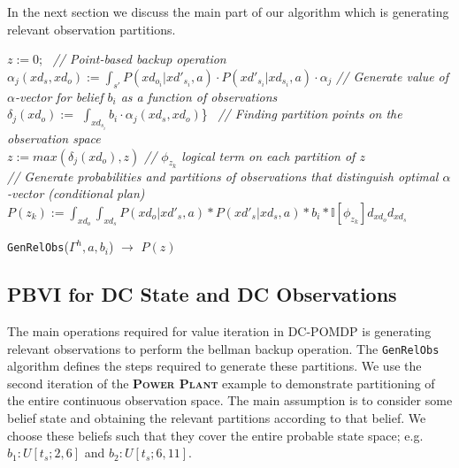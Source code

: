 \documentclass{article} %
\begin{document}
In the next section we discuss the main part of our algorithm which is generating relevant observation partitions.
\incmargin{.5em}
\linesnumbered
\begin{algorithm}[t!]
\vspace{-.5mm}
\dontprintsemicolon
{}

\Begin
{
	$z:=0$;\	
		{
		\emph{// Point-based backup operation}\\
    	$\alpha_j(xd_s,xd_o) := \int_{s'} P(xd_{o_i}|xd'_{s_i},a) \cdot P(xd'_{s_i}| xd_{s_i},a)\cdot \alpha_j $\;
		}  
		{
		\emph{// Generate value of $\alpha$-vector for belief $b_i$ as a function of observations}\\
		$\delta_{j}(xd_o) := $ $\int_{xd_{s_i}} b_i \cdot \alpha_j(xd_s,xd_o)$\}\ \;
		}
		{
		\emph{// Finding partition points on the observation space}\\
		$z := max(\delta_j(xd_o),z)$\;
    	}
    	\emph{// $\phi_{z_k}$ logical term on each partition of $z$}\\
    	\emph{// Generate probabilities and partitions of observations that distinguish optimal $\alpha$-vector (conditional plan)}\\
   		$P(z_k) := \int_{xd_o}\int_{xd_s} P(xd_o|xd'_s,a)*P(xd'_s|xd_s,a)*b_i* \mathbb{I}[\phi_{z_k}] d_{xd_o} d_{xd_s}$ \;
    \Return{$P(z)$} \;
}
\caption{\footnotesize \texttt{GenRelObs}($\Gamma^h,a,b_i$) $\longrightarrow$ $P(z)$ }
\vspace{-1mm}
\end{algorithm}
\decmargin{.5em}
\subsection{PBVI for DC State and DC Observations} 
\label{sec:cont_obs}

The main operations required for value iteration in DC-POMDP is generating relevant observations to perform the bellman backup operation. 
The \texttt{GenRelObs} algorithm defines the steps required to generate these partitions. 
We use the second iteration of the \textsc{\bf Power Plant} example to demonstrate partitioning of the entire continuous observation space. The main assumption is to consider some belief state and obtaining the relevant partitions according to that belief. We choose these beliefs such that they cover the entire probable state space; e.g. $b_1: U[t_s;2,6]$ and $b_2: U[t_s;6,11]$.
\end{document}

